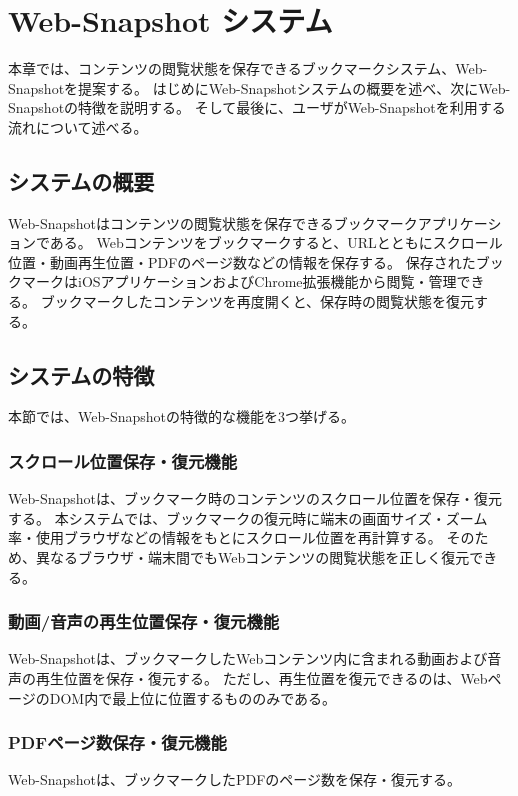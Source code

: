 \chapter{Web-Snapshot システム}
\label{chap:web_snapshot_system}
本章では、コンテンツの閲覧状態を保存できるブックマークシステム、Web-Snapshotを提案する。
はじめにWeb-Snapshotシステムの概要を述べ、次にWeb-Snapshotの特徴を説明する。
そして最後に、ユーザがWeb-Snapshotを利用する流れについて述べる。

\section{システムの概要}
Web-Snapshotはコンテンツの閲覧状態を保存できるブックマークアプリケーションである。
Webコンテンツをブックマークすると、URLとともにスクロール位置・動画再生位置・PDFのページ数などの情報を保存する。
保存されたブックマークはiOSアプリケーションおよびChrome拡張機能から閲覧・管理できる。
ブックマークしたコンテンツを再度開くと、保存時の閲覧状態を復元する。

\section{システムの特徴}
本節では、Web-Snapshotの特徴的な機能を3つ挙げる。

\subsection{スクロール位置保存・復元機能}
Web-Snapshotは、ブックマーク時のコンテンツのスクロール位置を保存・復元する。
本システムでは、ブックマークの復元時に端末の画面サイズ・ズーム率・使用ブラウザなどの情報をもとにスクロール位置を再計算する。
そのため、異なるブラウザ・端末間でもWebコンテンツの閲覧状態を正しく復元できる。

\subsection{動画/音声の再生位置保存・復元機能}
Web-Snapshotは、ブックマークしたWebコンテンツ内に含まれる動画および音声の再生位置を保存・復元する。
ただし、再生位置を復元できるのは、WebページのDOM内で最上位に位置するもののみである。

\subsection{PDFページ数保存・復元機能}
Web-Snapshotは、ブックマークしたPDFのページ数を保存・復元する。

